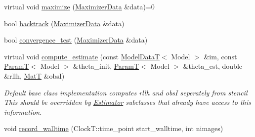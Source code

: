 \begin{DoxyCompactItemize}
\item 
virtual void \hyperlink{classmappel_1_1IterativeMaximizer_a4d05ed89de53e6e73f2f13bef30862ec}{maximize} (\hyperlink{classmappel_1_1IterativeMaximizer_1_1MaximizerData}{Maximizer\+Data} \&data)=0
\item 
bool \hyperlink{classmappel_1_1IterativeMaximizer_ac033d2b23a6a861e6d7adbe35f17624e}{backtrack} (\hyperlink{classmappel_1_1IterativeMaximizer_1_1MaximizerData}{Maximizer\+Data} \&data)
\item 
bool \hyperlink{classmappel_1_1IterativeMaximizer_aef9b61d66d785a1a06dd2c75c3166435}{convergence\+\_\+test} (\hyperlink{classmappel_1_1IterativeMaximizer_1_1MaximizerData}{Maximizer\+Data} \&data)
\item 
virtual void \hyperlink{classmappel_1_1Estimator_aa46d86cfb5c336c9cb8c106da036d7d1}{compute\+\_\+estimate} (const \hyperlink{namespacemappel_a97f050df953605381ae9c901c3b125f1}{Model\+DataT}$<$ Model $>$ \&im, const \hyperlink{namespacemappel_a667925cb0d6c0e49f2f035cc5a9a6857}{ParamT}$<$ Model $>$ \&theta\+\_\+init, \hyperlink{namespacemappel_a667925cb0d6c0e49f2f035cc5a9a6857}{ParamT}$<$ Model $>$ \&theta\+\_\+est, double \&rllh, \hyperlink{namespacemappel_a7091ab87c528041f7e2027195fad8915}{MatT} \&obsI)
\begin{DoxyCompactList}\small\item\em Default base class implementation computes rllh and obsI seperately from stencil This should be overridden by \hyperlink{classmappel_1_1Estimator}{Estimator} subclasses that already have access to this information. \end{DoxyCompactList}\item 
void \hyperlink{classmappel_1_1Estimator_a50125572d3b87ebcf1ffb27a8d8c643d}{record\+\_\+walltime} (Clock\+T\+::time\+\_\+point start\+\_\+walltime, int nimages)
\end{DoxyCompactItemize}
